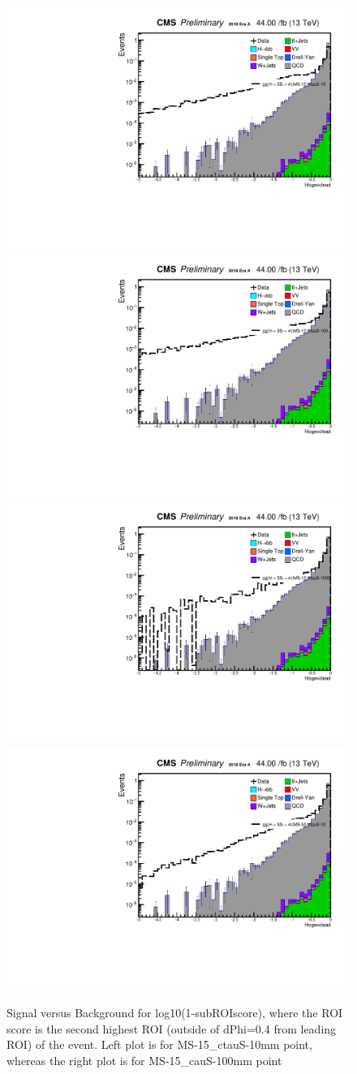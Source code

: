  \begin{figure}[h!]
   \caption{Signal versus Background for log10(1-subROIscore), where the ROI score is the second highest ROI (outside of dPhi=0.4 from leading ROI) of the event. Left plot is for MS-15\_ctauS-10mm point, whereas the right plot is for MS-15\_cauS-100mm point}
   \label{fig:excROIscore}
   \centering
   \includegraphics[width=0.47\linewidth]{figs/log_AnalysisNote_MS-15_ctauS-10_hlogexclead.pdf}
   \includegraphics[width=0.47\linewidth]{figs/log_AnalysisNote_MS-15_ctauS-100_hlogexclead.pdf}
   \includegraphics[width=0.47\linewidth]{figs/log_AnalysisNote_MS-15_ctauS-1000_hlogexclead.pdf}
   \includegraphics[width=0.47\linewidth]{figs/log_AnalysisNote_MS-55_ctauS-10_hlogexclead.pdf}
 \end{figure}

